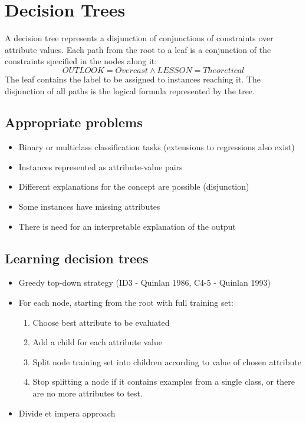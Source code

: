 \documentclass[a4paper, 10pt, titlepage]{article}
\begin{document}
\newpage
\section{Decision Trees}
A decision tree represents a disjunction of conjunctions of constraints over attribute values.
Each path from the root to a leaf is a conjunction of the constraints specified in the nodes along it:
$$OUTLOOK = Overcast \wedge LESSON = T heoretical$$
The leaf contains the label to be assigned to instances reaching it. The disjunction of all paths is the logical formula represented by the tree.

\subsection{Appropriate problems}
\begin{itemize}
\item Binary or multiclass classification tasks (extensions to regressions also exist)
\item Instances represented as attribute-value pairs
\item Different explanations for the concept are possible (disjunction)
\item Some instances have missing attributes
\item There is need for an interpretable explanation of the output
\end{itemize}

\subsection{Learning decision trees}
\begin{itemize}
\item Greedy top-down strategy (ID3 - Quinlan 1986, C4-5 - Quinlan 1993)
\item For each node, starting from the root with full training set:
\begin{enumerate}
\item Choose best attribute to be evaluated
\item Add a child for each attribute value
\item Split node training set into children according to value of chosen attribute
\item Stop splitting a node if it contains examples from a single class, or there are no more attributes to test.
\end{enumerate}
\item Divide et impera approach
\end{itemize}
\end{document}
